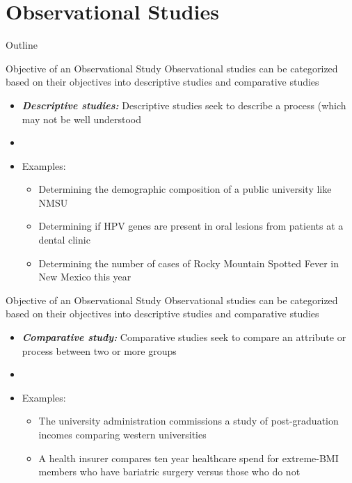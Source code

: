 \documentclass[xcolor=dvipsnames]{beamer}
\begin{document}
\section{Observational Studies}
\begin{frame}{Outline}
\tableofcontents[currentsection,subsectionstyle=show/shaded/hide]
\end{frame}

\begin{frame}{Objective of an Observational Study}
Observational studies can be categorized based on their objectives into descriptive studies and comparative studies \pause
		\begin{itemize}
			\item \textbf{\emph{Descriptive studies:}} Descriptive studies seek to describe a process (which may not be well understood \pause
			\item[]
			\item Examples: \pause
			\begin{itemize}
				\item Determining the demographic composition of a public university like NMSU \pause
				\item Determining if HPV genes are present in oral lesions from patients at a dental clinic \pause
				\item Determining the number of cases of Rocky Mountain Spotted Fever in New Mexico this year
			\end{itemize}			
		\end{itemize}
\end{frame}

\begin{frame}{Objective of an Observational Study}
Observational studies can be categorized based on their objectives into descriptive studies and comparative studies
\begin{itemize}
\item \textbf{\emph{Comparative study:}} Comparative studies seek to compare an attribute or process between two or more groups \pause
\item[]
\item Examples: \pause
\begin{itemize}
	\item The university administration commissions a study of post-graduation incomes comparing western universities \pause
	\item A health insurer compares ten year healthcare spend for extreme-BMI members who have bariatric surgery versus those who do not
\end{itemize}
\end{itemize}
\end{frame}
\end{document}
